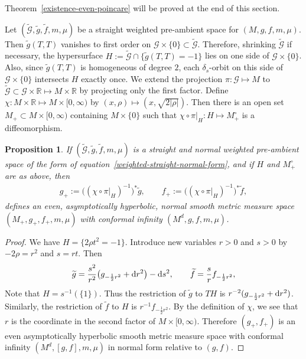 \documentclass[pdftex]{sigma}
\newcommand{\mG}{\mathcal{G}}
\numberwithin{equation}{section}
\newtheorem{Proposition}[Theorem]{Proposition}
 { \theoremstyle{definition}
\newtheorem{Definition}[Theorem]{Definition}
\newtheorem{Note}[Theorem]{Note}
\newtheorem{Example}[Theorem]{Example}
\newtheorem{Remark}[Theorem]{Remark} }
\begin{document}
Theorem~\ref{existence-even-poincare} will be proved at the end of this section.

Let $(\widetilde{\mG},\widetilde{g},\widetilde{f},m,\mu)$ be a straight weighted pre-ambient space for $(M,g,f,m,\mu)$. Then $\widetilde{g}(T,T)$ vanishes to first order on $\mG\times \{0\}\subset \widetilde{\mG}$. Therefore, shrinking $\widetilde{\mG}$ if necessary, the hypersurface $H:=\widetilde{\mG}\cap \{\widetilde{g}(T,T)=-1\}$ lies on one side of $\mG\times \{0\}$. Also, since $\widetilde{g}(T,T)$ is homogeneous of degree $2$, each $\delta_s$-orbit on this side of $\mathcal{G}\times \{0\}$ intersects $H$ exactly once. We extend the projection $\pi\colon \mG\mapsto M$ to $\widetilde{\mG}\subset \mG\times \mathbb{R}\mapsto M\times \mathbb{R}$ by projecting only the first factor. Define $\chi\colon M\times \mathbb{R}\mapsto M\times [0,\infty)$ by $(x,\rho)\mapsto (x,\sqrt{2|\rho|})$. Then there is an open set $M_+\subset M\times [0,\infty)$ containing $M\times \{0\}$ such that $\chi\circ \pi|_{H}\colon H\mapsto M_+^{\circ}$ is a diffeomorphism.

\begin{Proposition}
\label{straight-poincare-existence}
If $(\widetilde{\mathcal{G}},\widetilde{g},\widetilde{f},m,\mu)$ is a straight and normal weighted pre-ambient space of the form of equation~\eqref{weighted-straight-normal-form}, and if $H$ and $M_+^{\circ}$ are as above, then
\begin{gather*}
g_+:= \big((\chi\circ \pi|_{H})^{-1}\big)^* \widetilde{g},\qquad
f_+:= \big((\chi\circ \pi|_{H})^{-1}\big)^* \widetilde{f},
\end{gather*}
defines an even, asymptotically hyperbolic, normal smooth metric measure space $(M_+,g_+,f_+,\allowbreak m,\mu)$ with conformal infinity $(M^d,g,f,m,\mu)$.
\end{Proposition}

\begin{proof}
We have $H=\{2\rho t^2=-1\}$. Introduce new variables $r>0$ and $s>0$ by $-2\rho=r^2$ and $s=rt$. Then
\begin{gather*}
\widetilde{g}= \frac{s^2}{r^2}\big(g_{-\frac{1}{2}r^2}+{\rm d}r^2\big)-{\rm d}s^2,
\qquad
\widetilde{f}= \frac{s}{r}f_{-\frac{1}{2}r^2},
\end{gather*}
Note that $H=s^{-1}(\{1\})$. Thus the restriction of $\widetilde{g}$ to $TH$ is $r^{-2}(g_{-\frac{1}{2}r^2}+{\rm d}r^2)$. Similarly, the restriction of $\widetilde{f}$ to $H$ is $r^{-1}f_{-\frac{1}{2}r^2}$. By the definition of $\chi$, we see that $r$ is the coordinate in the second factor of $M\times [0,\infty)$. Therefore $(g_+,f_+)$ is an even asymptotically hyperbolic smooth metric measure space with conformal infinity $(M^d,[g,f],m,\mu)$ in normal form relative to $(g,f)$.
\end{proof}
\end{document}
